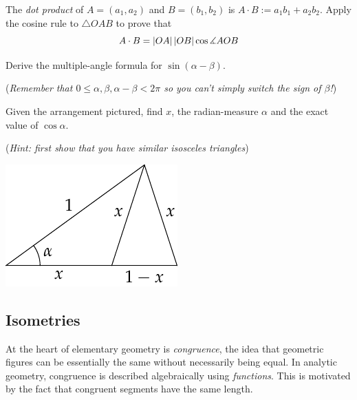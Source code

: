 \begin{exercises}{}{}
\begin{enumerate}
		\item The \emph{dot product} of $A=(a_1,a_2)$ and $B=(b_1,b_2)$ is $A\cdot B:=a_1b_1+a_2b_2$. Apply the cosine rule to $\triangle OAB$ to prove that
		\[
			A\cdot B=\left| OA\right|\left| OB\right|\cos\measuredangle AOB
		\]
		
		
		\item Derive the multiple-angle formula for $\sin(\alpha-\beta)$.\par
		(\emph{Remember that $0\le \alpha,\beta, \alpha-\beta<2\pi$ so you can't simply switch the sign of $\beta$!})
		
		
		\begin{minipage}[t]{0.7\linewidth}\vspace{0pt}
			\item Given the arrangement pictured, find $x$, the radian-measure $\alpha$ and the exact value of $\cos\alpha$.\par
			(\emph{Hint: first show that you have similar isosceles triangles})	
		\end{minipage}
		\hfill
		\begin{minipage}[t]{0.29\linewidth}\vspace{0pt}
			\flushright\includegraphics[scale=0.9]{angles-sin36}
		\end{minipage}
	\end{enumerate}
\end{exercises}

\clearpage



\subsection{Isometries}\label{sec:klein}

At the heart of elementary geometry is \emph{congruence}, the idea that geometric figures can be essentially the same without necessarily being equal. In analytic geometry, congruence is described algebraically using \emph{functions}. This is motivated by the fact that congruent segments have the same length.

